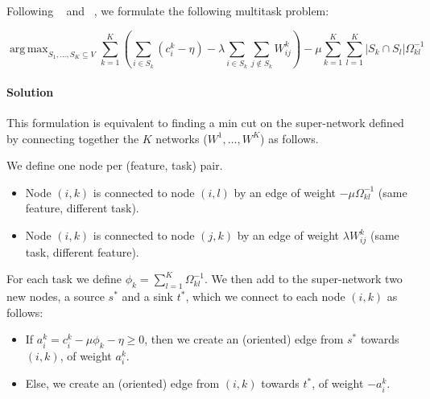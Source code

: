 \documentclass[12pt,a4paper]{article}
\newcommand{\sset}{S}
\newcommand{\vset}{V}
\DeclareMathOperator*{\argmax}{arg\,max}
\begin{document}

Following ~\cite{zhang09} and ~\cite{fei13}, we formulate the following multitask problem:

\begin{equation}
\argmax_{\sset_1, \dots, \sset_K \subseteq \vset } \sum_{k=1}^K \left ( \sum_{i \in \sset_k} (c_i^k - \eta)
- \lambda \sum_{i \in \sset_k} \sum_{j \notin \sset_k} W_{ij}^k \right )
- \mu \sum_{k=1}^K \sum_{l=1}^K |\sset_k \cap \sset_l| \Omega_{kl}^{-1}
\label{eq:msfan}
\end{equation}




\paragraph{Solution}
This formulation is equivalent to finding a min cut on the super-network defined by connecting together the $K$ networks ($W^1, \dots, W^K$) as follows.

We define one node per (feature, task) pair.
\begin{itemize}
\item Node $(i, k)$ is connected to node $(i, l)$ 
  by an edge of weight $- \mu \Omega_{kl}^{-1}$ (same feature, different task). 
\item Node $(i, k)$ is connected to node $(j, k)$
  by an edge of weight $\lambda W_{ij}^{k}$ (same task, different feature). 
\end{itemize}

For each task we define $\phi_k = \sum_{l=1}^K \Omega_{kl}^{-1}$.
We then add to the super-network two new nodes, a source $s^*$ and a sink $t^*$, 
which we connect to each node $(i, k)$ as follows:
\begin{itemize}
\item If $a_i^k = c_i^k - \mu \phi_k - \eta \geq 0$, then we create an (oriented) edge from $s^*$ towards $(i, k)$,
  of weight $a_i^k$.
\item Else, we create an (oriented) edge from $(i, k)$ towards $t^*$, of weight $-a_i^k$.
\end{itemize}
\end{document}
